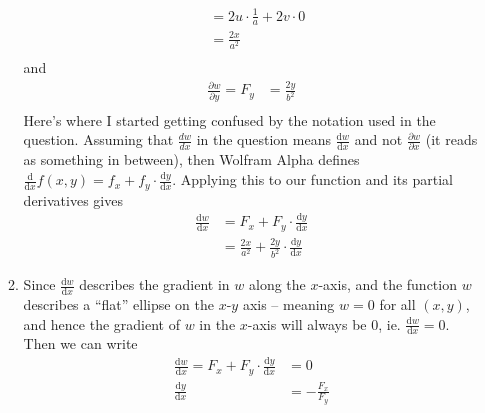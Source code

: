 \documentclass[10pt]{article}
\begin{document}
\begin{enumerate}
\begin{enumerate}
\begin{align*}
                                        &= 2u \cdot \frac{1}{a} + 2v \cdot 0 \\
                                        &= \frac{2x}{a^2} \\
                            \end{align*}
                            and
                            \begin{align*}
                                        \frac{\partial w}{\partial y} = F_y &= \frac{2y}{b^2} \\
                            \end{align*}
                            Here's where I started getting confused by the
                            notation used in the question. Assuming that
                            $\frac{dw}{dx}$ in the question means
                            $\frac{\text{d}w}{\text{d}x}$ and not
                            $\frac{\partial w}{\partial x}$ (it reads as
                            something in between), then Wolfram Alpha defines
                            $\frac{\text{d}}{\text{d}x}f(x,y) = f_x + f_y\cdot\frac{\text{d}y}{\text{d}x}$. Applying this to our function and its partial derivatives gives
                            \begin{align*}
                                \frac{\text{d}w}{\text{d}x} &= F_x + F_y \cdot \frac{\text{d}y}{\text{d}x} \\
                                &= \frac{2x}{a^2} + \frac{2y}{b^2} \cdot \frac{\text{d}y}{\text{d}x}
                            \end{align*}
                        \item Since $\frac{\text{d} w}{\text{d} x}$ describes the
                            gradient in $w$ along the $x$-axis, and the
                            function $w$ describes a ``flat'' ellipse on the
                            $x$-$y$ axis -- meaning $w = 0$ for all $(x, y)$,
                            and hence the gradient of $w$ in the $x$-axis will
                            always be 0, ie. $\frac{\text{d} w}{\text{d} x} = 0$.
                            Then we can write 
                            \begin{align*}
                                \frac{\text{d}w}{\text{d}x} = F_x + F_y \cdot \frac{\text{d}y}{\text{d}x} &= 0\\
                                \frac{\text{d}y}{\text{d}x} &= -\frac{F_x}{F_y} \\
                            \end{align*}

\end{enumerate}
\end{enumerate}
\end{document}

